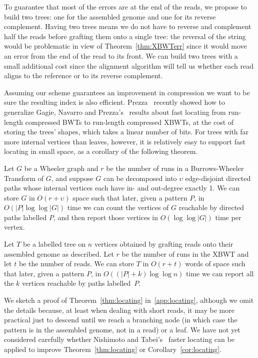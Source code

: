 To guarantee that most of the errors are at the end of the reads, we propose to build two trees: one for the assembled genome and one for its reverse complement. Having two trees means we do not have to reverse and complement half the reads before grafting them onto a single tree: the reversal of the string would be problematic in view of Theorem~\ref{thm:XBWTerr} since it would move an error from the end of the read to its front. We can build two trees with a small additional cost since the alignment algorithm will tell us whether each read aligns to the reference or to its reverse complement.

Assuming our scheme guarantees an improvement in compression we want to be sure the resulting index is also efficient. Prezza~\cite{prezza2021locating} recently showed how to generalize Gagie, Navarro and Prezza's~\cite{gagie2020fully} results about fast locating from run-length compressed BWTs to run-length compressed XBWTs, at the cost of storing the trees' shapes, which takes a linear number of bits.  For trees with far more internal vertices than leaves, however, it is relatively easy to support fast locating in small space, as a corollary of the following theorem.

\begin{theorem}
\label{thm:locating}
Let $G$ be a Wheeler graph and $r$ be the number of runs in a Burrows-Wheeler Transform of $G$, and suppose $G$ can be decomposed into $\upsilon$ edge-disjoint directed paths whose internal vertices each have in- and out-degree exactly 1.  We can store $G$ in $O (r + \upsilon)$ space such that later, given a pattern $P$, in $O (|P| \log \log |G|)$ time we can count the vertices of $G$ reachable by directed paths labelled $P$, and then report those vertices in $O (\log \log |G|)$ time per vertex.
\end{theorem}

\begin{corollary}
\label{cor:locating}
Let $T$ be a labelled tree on $n$ vertices obtained by grafting reads onto their assembled genome as described.  Let $r$ be the number of runs in the XBWT and let $t$ be the number of reads.  We can store $T$ in $O (r + t)$ words of space such that later, given a pattern $P$, in $O ((|P| + k) \log \log n)$ time we can report all the $k$ vertices reachable by paths labelled~$P$.
\end{corollary}

We sketch a proof of Theorem~\ref{thm:locating} in~\ref{app:locating}, although we omit the details because, at least when dealing with short reads, it may be more practical just to descend until we reach a branching node (in which case the pattern is in the assembled genome, not in a read) or a leaf. We have not yet considered carefully whether Nishimoto and Tabei's~\cite{nishimoto2020faster} faster locating can be applied to improve Theorem~\ref{thm:locating} or Corollary~\ref{cor:locating}.

